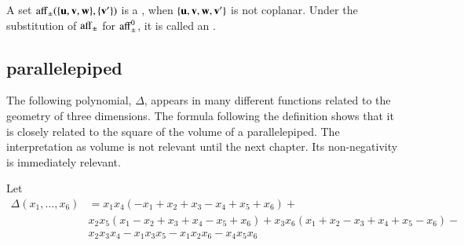 \begin{definition} A set ${\operatorname{aff}}_{\pm}(\{{\mathbf u},{\mathbf v},{\mathbf w}\},\{{\mathbf v}'\})$ is a ,
when $\{{\mathbf u},{\mathbf v},{\mathbf w},{\mathbf v}'\}$ is not coplanar.  Under the substitution of
${\operatorname{aff}}_{\pm}$ for ${\operatorname{aff}}_{\pm}^0$, it is called an
.
\end{definition}
%
%

\subsection{parallelepiped}\label{sec:piped}
%



The following polynomial, $\Delta$,  appears in many different functions related to the geometry of three dimensions.  The formula following the definition shows that it is closely related to the square of the volume of a parallelepiped.  The interpretation as  volume is not relevant until the next chapter.  Its non-negativity is immediately relevant. 
%

\begin{definition}[$\Delta$]\label{def:delta}  Let 
\begin{displaymath}
\begin{array}{lll}
\Delta(x_1,\ldots,x_6) &= x_1 x_4 (- x_1+x_2+x_3- x_4+x_5+x_6)+\\&
            x_2 x_5 (x_1- x_2+x_3+x_4- x_5+x_6)
            +x_3 x_6 (x_1+x_2- x_3+x_4+x_5- x_6)
            - \\&x_2 x_3 x_4- x_1 x_3 x_5- x_1 x_2 x_6- x_4 x_5 x_6
\end{array}
\end{displaymath}
\end{definition}
%
%

